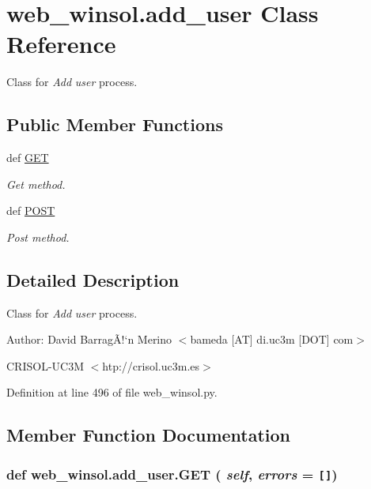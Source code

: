 \hypertarget{classweb__winsol_1_1add__user}{
\section{web\_\-winsol.add\_\-user Class Reference}
\label{classweb__winsol_1_1add__user}
}
Class for {\em Add\/} {\em user\/} process.  


\subsection*{Public Member Functions}
\begin{CompactItemize}
\item 
def \hyperlink{classweb__winsol_1_1add__user_72e301fca7acdf99f0b1f84f98024cf1}{GET}
\begin{CompactList}\small\item\em Get method. \item\end{CompactList}\item 
def \hyperlink{classweb__winsol_1_1add__user_10b3cb243b874f49cc024ac8ad86b773}{POST}
\begin{CompactList}\small\item\em Post method. \item\end{CompactList}\end{CompactItemize}


\subsection{Detailed Description}
Class for {\em Add\/} {\em user\/} process. 

\begin{Desc}
\item[Author:]David Barrag\~{A}!`n Merino $<$bameda \mbox{[}AT\mbox{]} di.uc3m \mbox{[}DOT\mbox{]} com$>$ 

CRISOL-UC3M $<$htp://crisol.uc3m.es$>$ \end{Desc}




Definition at line 496 of file web\_\-winsol.py.

\subsection{Member Function Documentation}
\hypertarget{classweb__winsol_1_1add__user_72e301fca7acdf99f0b1f84f98024cf1}{
\subsubsection[GET]{\setlength{\rightskip}{0pt plus 5cm}def web\_\-winsol.add\_\-user.GET ( {\em self},  {\em errors} = {\tt \mbox{[}\mbox{]}})}}
\label{classweb__winsol_1_1add__user_72e301fca7acdf99f0b1f84f98024cf1}


